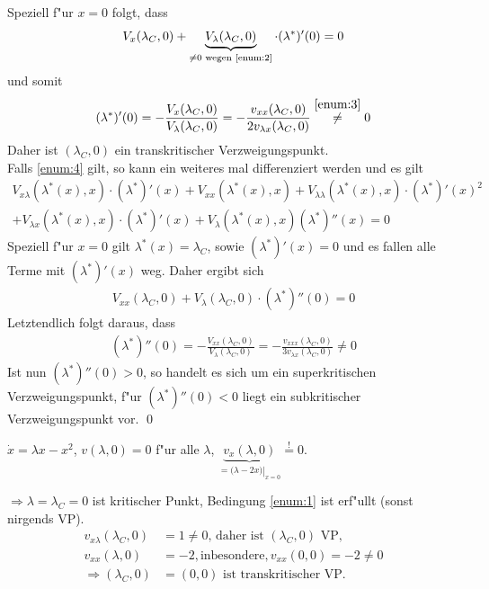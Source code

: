 \documentclass[a4paper, 13pt]{scrreprt}
\theoremstyle{definition} \newtheorem{definition}{Definition}[section]
\newenvironment{beweis}[1][Beweis]{\begin{trivlist}
\item[\hskip \labelsep {\bfseries #1}]}{\end{trivlist}}
\newenvironment{beispiel}[1][Beispiel]{\begin{trivlist}
\item[\hskip \labelsep {\bfseries #1}]}{\end{trivlist}}
\begin{document}
\begin{beweis}
Speziell f"ur $x=0$ folgt, dass
\[
V_x(\lambda_C,0) + \underbrace{V_\lambda(\lambda_C,0)}_{\neq 0\text{ wegen \ref{enum:2}}}\cdot(\lambda^*)'(0) = 0
\]
und somit
\[
(\lambda^*)'(0) = -\frac{V_x(\lambda_C,0)}{V_\lambda(\lambda_C,0)} = -\frac{v_{xx}(\lambda_C,0)}{2v_{\lambda x}(\lambda_C,0)}\stackrel{\ref{enum:3}}{\neq}0
\]
Daher ist $(\lambda_C,0)$ ein transkritischer Verzweigungspunkt.
\\
Falls \ref{enum:4} gilt, so kann ein weiteres mal differenziert werden und es gilt
\begin{align*}
V_{x\lambda}(\lambda^*(x),x)\cdot(\lambda^*)'(x) + V_{xx}(\lambda^*(x),x) + V_{\lambda\lambda}(\lambda^*(x),x)\cdot(\lambda^*)'(x)^2\\
 + V_{\lambda x}(\lambda^*(x),x)\cdot(\lambda^*)'(x) + V_\lambda(\lambda^*(x),x)(\lambda^*)''(x) = 0
\end{align*}
Speziell f"ur $x = 0$ gilt $\lambda^*(x) = \lambda_C$, sowie $(\lambda^*)'(x) = 0$ und es fallen alle Terme mit $(\lambda^*)'(x)$ weg. Daher ergibt sich
\begin{align*}
V_{xx}(\lambda_C,0) + V_\lambda(\lambda_C,0)\cdot(\lambda^*)''(0)=0
\end{align*}
Letztendlich folgt daraus, dass
\begin{align*}
(\lambda^*)''(0) = -\frac{V_{xx}(\lambda_C,0)}{V_\lambda(\lambda_C,0)} = -\frac{v_{xxx}(\lambda_C,0)}{3v_{\lambda x}(\lambda_C,0)}\neq 0
\end{align*}
Ist nun $(\lambda^*)''(0) > 0$, so handelt es sich um ein superkritischen Verzweigungspunkt, f"ur $(\lambda^*)''(0) < 0$ liegt ein subkritischer Verzweigungspunkt vor.
\qed
\end{beweis}

\begin{beispiel}
$\dot x = \lambda x - x^2$, $v(\lambda,0) = 0$ f"ur alle $\lambda$, $\underbrace{v_x(\lambda,0)}_{= (\left.\lambda - 2x)\right|_{x = 0}}\stackrel{!}{=}0$.

$\Rightarrow\lambda = \lambda_C = 0$  ist kritischer Punkt, Bedingung \ref{enum:1} ist erf"ullt (sonst nirgends VP).
\begin{align*}
v_{x\lambda}(\lambda_C,0) &= 1\neq 0\text{, daher ist } (\lambda_C,0)\text{ VP,}\\
v_{xx}(\lambda,0) &= -2,\text{inbesondere},v_{xx}(0,0) = -2\neq 0 \\
\Rightarrow(\lambda_C,0) &= (0,0)\text{ ist transkritischer VP.}
\end{align*}
\end{beispiel}
\end{document}
